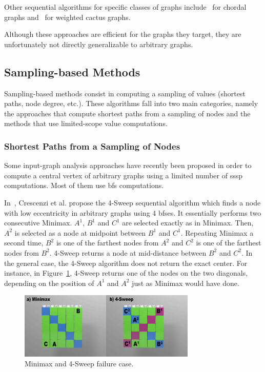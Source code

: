 Other sequential algorithms for specific classes of graphs include~\cite{chepoi1994linear} for chordal graphs and~\cite{lan1999linear} for weighted cactus graphs. 

Although these approaches are efficient for the graphs they target, they are unfortunately not directly generalizable to arbitrary graphs.

\subsection{Sampling-based Methods}

Sampling-based methods consist in computing a sampling of values (shortest paths, node degree, etc.). These algorithms fall into two main categories, namely the approaches that compute shortest paths from a sampling of nodes and the methods that use limited-scope value computations.

\subsubsection{Shortest Paths from a Sampling of Nodes}

Some input-graph analysis approaches have recently been proposed in order to compute a central vertex of arbitrary graphs using a limited number of \gls{sssp} computations. Most of them use \gls{bfs} computations.

In~\cite{crescenzi2013computing}, Crescenzi et al. propose the 4-Sweep sequential algorithm which finds a node with low eccentricity in arbitrary graphs using 4 \gls{bfses}. It essentially performs two consecutive Minimax. $A^1$, $B^1$ and $C^1$ are selected exactly as in Minimax. Then, $A^2$ is selected as a node at midpoint between $B^1$ and $C^1$. Repeating Minimax a second time, $B^2$ is one of the farthest nodes from $A^2$ and $C^2$ is one of the farthest nodes from $B^2$. 4-Sweep returns a node at mid-distance between $B^2$ and $C^2$. In the general case, the 4-Sweep algorithm does not return the exact center. For instance, in Figure~\ref{fig:centrality:2sweep-4sweep}, 4-Sweep returns one of the nodes on the two diagonals, depending on the position of $A^1$ and $A^2$ just as Minimax would have done.

\begin{figure}[t!]
	\centering
	\includegraphics[width=0.75\textwidth]{images/centrality/twoSweepFourSweepFailure.png}
	\caption{Minimax and 4-Sweep failure case.\label{fig:centrality:2sweep-4sweep}}
\end{figure}

